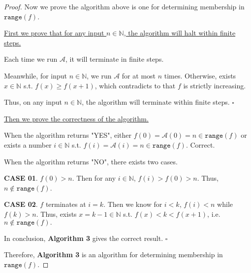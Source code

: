 \documentclass{article}
\newcommand{\whiteqed}{\hfill $\square$\par}
\begin{document}
\begin{proof}
    \vspace{-0.9em} \hspace{1.3em}
    Now we prove the algorithm above is one for determining membership in $\mathtt{range}(f)$.

    \vspace{1em} \hspace{1.3em}
    \underline{First we prove that for any input $n\in\mathbb{N}$, the algorithm will halt within finite steps.}
    
    \hspace{1.3em}
    Each time we run $\mathcal{A}$, it will terminate in finite steps. 
    
    \hspace{1.3em}
    Meanwhile, for input $n\in\mathbb{N}$, we run $\mathcal{A}$ for at most $n$ times. Otherwise, exists $x\in\mathbb{N}$ s.t. $f(x)\geq f(x+1)$, which contradicts
    to that $f$ is strictly increasing.

    \hspace{1.3em}
    Thus, on any input $n\in\mathbb{N}$, the algorithm will terminate within finite steps. \whiteqed

    \vspace{1em} \hspace{1.3em}
    \underline{Then we prove the correctness of the algorithm.}
    
    \hspace{1.3em}
    When the algorithm returns "YES", either $f(0)=\mathcal{A}(0)=n\in\mathtt{range}(f)$ or exists a number $i\in\mathbb{N}$ s.t. $f(i)=\mathcal{A}(i)=n\in\mathtt{range}(f)$. Correct.

    \hspace{1.3em}
    When the algorithm returns "NO", there exists two cases. 
    
    \hspace{1.3em}
    \textbf{CASE 01}. $f(0)>n$. Then for any $i\in\mathbb{N}$, $f(i)>f(0)>n$. Thus, $n\notin\mathtt{range}(f)$.

    \hspace{1.3em}
    \textbf{CASE 02}. $f$ terminates at $i=k$. Then we know for $i<k$, $f(i)<n$ while $f(k)>n.$ Thus, exists $x=k-1\in\mathbb{N}$ s.t. $f(x)<k<f(x+1)$, i.e. $n\notin\mathtt{range}(f).$

    \hspace{1.3em}
    In conclusion, \textbf{Algorithm 3} gives the correct result. \whiteqed

    \vspace{1em} \hspace{1.3em}
    Therefore, \textbf{Algorithm 3} is an algorithm for determining membership in $\mathtt{range}(f)$.
\end{proof}
\end{document}
